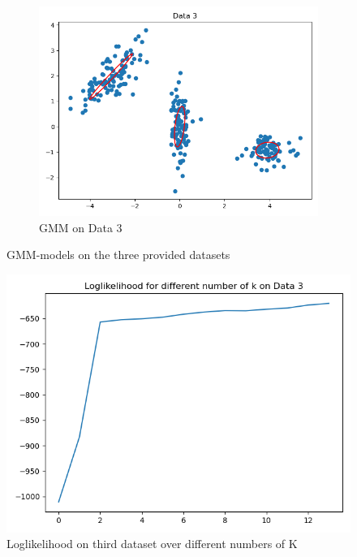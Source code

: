 \documentclass{scrartcl}
\begin{document}
\begin{figure}[h]
\begin{subfigure}[b]{0.3\textwidth}
			\centering
			\includegraphics[width=\textwidth]{images/data3}
			\caption{GMM on Data 3}
		\end{subfigure}
		\caption{GMM-models on the three provided datasets}
		\label{fig:three graphs}
	\end{figure}

\begin{figure}
	\centering
	\includegraphics[width=.5\textwidth]{images/data3loglikelihood}
	\caption{Loglikelihood on third dataset over different numbers of K}
\end{figure}
\end{document}
